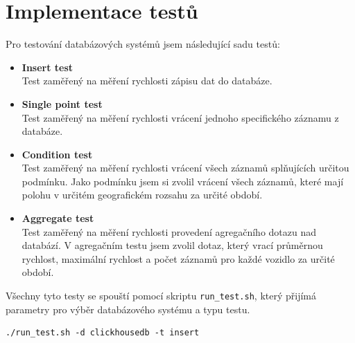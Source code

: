 \section{Implementace testů}
Pro testování databázových systémů jsem následující sadu testů:
\begin{itemize}
    \item \textbf{Insert test} \\
    Test zaměřený na měření rychlosti zápisu dat do databáze.
    \item \textbf{Single point test} \\
    Test zaměřený na měření rychlosti vrácení jednoho specifického záznamu z databáze.
    \item \textbf{Condition test} \\
    Test zaměřený na měření rychlosti vrácení všech záznamů splňujících určitou podmínku.
    Jako podmínku jsem si zvolil vrácení všech záznamů, které mají polohu v určitém geografickém rozsahu za určité období.
    \item \textbf{Aggregate test} \\
    Test zaměřený na měření rychlosti provedení agregačního dotazu nad databází.
    V agregačním testu jsem zvolil dotaz, který vrací průměrnou rychlost, maximální rychlost a počet záznamů pro každé vozidlo za určité období.
\end{itemize}
Všechny tyto testy se spouští pomocí skriptu \texttt{run\_test.sh}, který přijímá parametry pro výběr databázového systému a typu testu.
\begin{lstlisting}[caption={Příklad spuštění live insert testu}, label={lst:liveinsert}, captionpos=b]
    ./run_test.sh -d clickhousedb -t insert
\end{lstlisting}
